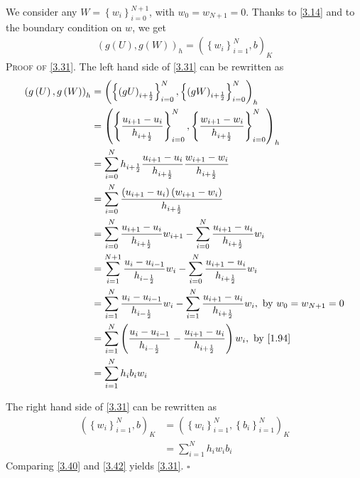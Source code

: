 \documentclass[a4paper]{article}
\numberwithin{equation}{section}
\begin{document}
We consider any $W=\left\{ {{w_i}} \right\}_{i = 0}^{N + 1}$, with $w_0=w_{N+1}=0$. Thanks to \eqref{3.14} and to the boundary condition on $w$, we get
\begin{align}
\label{3.31}
{\left( {g\left( U \right),g\left( W \right)} \right)_h} = {\left( {\left\{ {{w_i}} \right\}_{i = 1}^N,b} \right)_K}
\end{align}
\textsc{Proof of \eqref{3.31}.} The left hand side of \eqref{3.31} can be rewritten as
\begin{align}
{\left( {g\left( U \right),g\left( W \right)} \right)_h} &= {\left( {\left\{ {{{\left( {gU} \right)}_{i + \frac{1}{2}}}} \right\}_{i = 0}^N,\left\{ {{{\left( {gW} \right)}_{i + \frac{1}{2}}}} \right\}_{i = 0}^N} \right)_h}\\
 &= {\left( {\left\{ {\frac{{{u_{i + 1}} - {u_i}}}{{{h_{i + \frac{1}{2}}}}}} \right\}_{i = 0}^N,\left\{ {\frac{{{w_{i + 1}} - {w_i}}}{{{h_{i + \frac{1}{2}}}}}} \right\}_{i = 0}^N} \right)_h}\\
& = \sum\limits_{i = 0}^N {{h_{i + \frac{1}{2}}}\frac{{{u_{i + 1}} - {u_i}}}{{{h_{i + \frac{1}{2}}}}}\frac{{{w_{i + 1}} - {w_i}}}{{{h_{i + \frac{1}{2}}}}}} \\
 &= \sum\limits_{i = 0}^N {\frac{{\left( {{u_{i + 1}} - {u_i}} \right)\left( {{w_{i + 1}} - {w_i}} \right)}}{{{h_{i + \frac{1}{2}}}}}} \\
& = \sum\limits_{i = 0}^N {\frac{{{u_{i + 1}} - {u_i}}}{{{h_{i + \frac{1}{2}}}}}{w_{i + 1}}}  - \sum\limits_{i = 0}^N {\frac{{{u_{i + 1}} - {u_i}}}{{{h_{i + \frac{1}{2}}}}}{w_i}} \\
 &= \sum\limits_{i = 1}^{N + 1} {\frac{{{u_i} - {u_{i - 1}}}}{{{h_{i - \frac{1}{2}}}}}{w_i}}  - \sum\limits_{i = 0}^N {\frac{{{u_{i + 1}} - {u_i}}}{{{h_{i + \frac{1}{2}}}}}{w_i}} \\
 &= \sum\limits_{i = 1}^N {\frac{{{u_i} - {u_{i - 1}}}}{{{h_{i - \frac{1}{2}}}}}{w_i}}  - \sum\limits_{i = 1}^N {\frac{{{u_{i + 1}} - {u_i}}}{{{h_{i + \frac{1}{2}}}}}{w_i}} ,\mbox{ by } {w_0} = {w_{N + 1}} = 0\\
 &= \sum\limits_{i = 1}^N {\left( {\frac{{{u_i} - {u_{i - 1}}}}{{{h_{i - \frac{1}{2}}}}} - \frac{{{u_{i + 1}} - {u_i}}}{{{h_{i + \frac{1}{2}}}}}} \right){w_i}}, \mbox{ by \eqref{1.94}}\\
& = \sum\limits_{i = 1}^N {{h_i}{b_i}{w_i}} \label{3.40}
\end{align}

The right hand side of \eqref{3.31} can be rewritten as
\begin{align}
{\left( {\left\{ {{w_i}} \right\}_{i = 1}^N,b} \right)_K} &= {\left( {\left\{ {{w_i}} \right\}_{i = 1}^N,\left\{ {{b_i}} \right\}_{i = 1}^N} \right)_K}\\
 &= \sum\limits_{i = 1}^N {{h_i}{w_i}{b_i}} \label{3.42}
\end{align}
Comparing \eqref{3.40} and \eqref{3.42} yields \eqref{3.31}. \hfill $\square$\\
\end{document}
